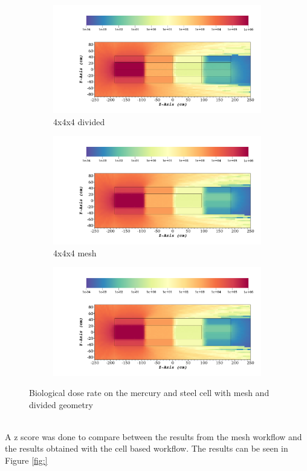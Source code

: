 \begin{figure}
	\begin{subfigure}[t]{0.5\textwidth}
		\includegraphics[width=\linewidth, trim={8cm 2cm 2cm 10cm},clip]{../figs/toy_p2/dose_VPII_4x_split.png}
		\caption{4x4x4 divided}
		\label{fig:2dose_4x_split}
	\end{subfigure}\hfill
	\begin{subfigure}[t]{0.5\textwidth}
		\includegraphics[width=\linewidth, trim={8cm 2cm 2cm 10cm},clip]{../figs/toy_p2/dose_VPII_4x_mesh.png}
		\caption{4x4x4 mesh}
		\label{fig:2dose_4x_mesh}
	\end{subfigure}

	\begin{subfigure}[t]{1.0\textwidth}
		\includegraphics[width=\linewidth, trim={8cm 26cm 2cm 2cm},clip]{../figs/toy_p2/dose_VPII_4x_mesh.png}
		\label{fig:2legend}
	\end{subfigure}
	\caption{Biological dose rate on the mercury and steel cell with mesh and divided geometry}
	\label{fig:2dose}
\end{figure}
\\
A z score was done to compare between the results from the mesh workflow and the results
obtained with the cell based workflow. The results can be seen in Figure \ref{fig:}

